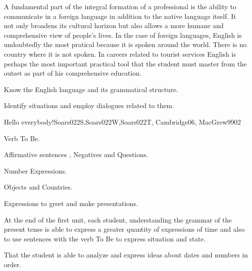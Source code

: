 \begin{syllabus}


\begin{justification}
A fundamental part of the integral formation of a professional is the ability to communicate in a foreign language in addition to the native language itself. 
It not only broadens its cultural horizon but also allows a more humane and comprehensive view of people's lives. In the case of foreign languages, English is undoubtedly the most pratical because it is spoken around the world. There is no country where it is not spoken. In careers related to tourist services English is perhaps the most important practical tool that the student must master from the outset as part of his comprehensive education.
\end{justification}

\begin{goals}
\item Know the English language and its grammatical structure.
\item Identify situations and employ dialogues related to them.
\end{goals}

\begin{competences}
    \item {}
\end{competences}

\begin{outcomes}
\item {}
\item {}
\end{outcomes}

\begin{unit}{Hello everybody!}{}{Soars022S,Soars022W,Soars022T, Cambridge06, MacGrew99}{0}{2}
   \begin{topics}
      \item Verb To Be.
      \item Affirmative sentences , Negatives and Questions.
      \item Number Expressions.
      \item Objects and Countries.
      \item Expressions to greet and make presentations.
   \end{topics}

   \begin{learningoutcomes}
      \item At the end of the first unit, each student, understanding
            the grammar of the present tense is able to express a greater quantity of expressions of time and also to use sentences with the verb To Be to express situation and state.
      \item That the student is able to analyze and express ideas about dates and numbers in order. 
   \end{learningoutcomes}
\end{unit}


\end{syllabus}
